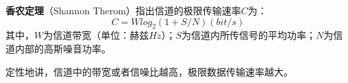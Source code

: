 
\textbf{香农定理}（Shannon Therom）指出信道的极限传输速率$C$为：
\begin{equation}
C=Wlog_2(1+S/N)    (bit/s)
\end{equation}
其中，$W$为信道带宽（单位：赫兹$Hz$）；$S$为信道内所传信号的平均功率；$N$为信道内部的高斯噪音功率。

定性地讲，信道中的带宽或者信噪比越高，极限数据传输速率越大。